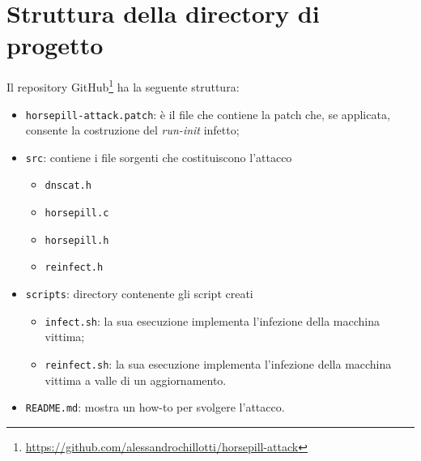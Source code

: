 \documentclass[oneside]{article}
\begin{document}
\section{Struttura della directory di progetto}
Il repository GitHub\footnote{\url{https://github.com/alessandrochillotti/horsepill-attack}} ha la seguente struttura:
\begin{itemize}
\item \texttt{horsepill-attack.patch}: è il file che contiene la patch che, se applicata, consente la costruzione del \textit{run-init} infetto;
\item \texttt{src}: contiene i file sorgenti che costituiscono l'attacco
\begin{itemize}
\item \texttt{dnscat.h}
\item \texttt{horsepill.c}
\item \texttt{horsepill.h}
\item \texttt{reinfect.h}
\end{itemize}
\item \texttt{scripts}: directory contenente gli script creati
\begin{itemize}
\item \texttt{infect.sh}: la sua esecuzione implementa l'infezione della macchina vittima;
\item \texttt{reinfect.sh}: la sua esecuzione implementa l'infezione della macchina vittima a valle di un aggiornamento.
\end{itemize}
\item \texttt{README.md}: mostra un how-to per svolgere l'attacco.
\end{itemize}
\end{document}
